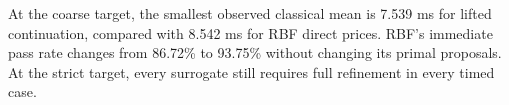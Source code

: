 At the coarse target, the smallest observed classical mean is 7.539 ms for lifted continuation, compared with 8.542 ms for RBF direct prices. RBF's immediate pass rate changes from 86.72\% to 93.75\% without changing its primal proposals. At the strict target, every surrogate still requires full refinement in every timed case.

